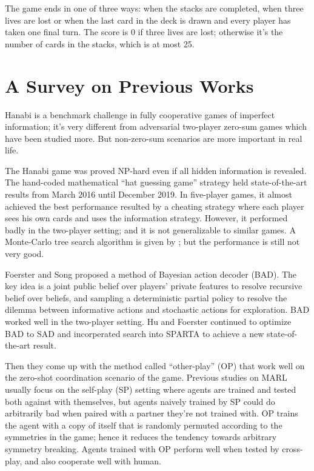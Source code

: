 \documentclass[11pt]{article}
\begin{document}
The game ends in one of three ways: when the stacks are completed, when three lives are lost or when the last card in the deck is drawn and every player has taken one final turn. The score is 0 if three lives are lost; otherwise it's the number of cards in the stacks, which is at most 25.

\section{A Survey on Previous Works}

Hanabi is a benchmark challenge in fully cooperative games of imperfect information; it's very different from adversarial two-player zero-sum games which have been studied more.\cite{bard2020the} But non-zero-sum scenarios are more important in real life.

The Hanabi game was proved \textsf{NP}-hard even if all hidden information is revealed.\cite{baffier2017hanabi} The hand-coded mathematical ``hat guessing game'' strategy\cite{cox2015how} held state-of-the-art results from March 2016 until December 2019. In five-player games, it almost achieved the best performance resulted by a cheating strategy where each player sees his own cards and uses the information strategy. However, it performed badly in the two-player setting\cite{bouzy2017playing}; and it is not generalizable to similar games. A Monte-Carlo tree search algorithm is given by \cite{walton-rivers2017evaluating}; but the performance is still not very good.

Foerster and Song proposed a method of Bayesian action decoder (BAD)\cite{foerster2018bayesian}. The key idea is a joint public belief over players' private features to resolve recursive belief over beliefs, and sampling a deterministic partial policy to resolve the dilemma between informative actions and stochastic actions for exploration. BAD worked well in the two-player setting. Hu and Foerster continued to optimize BAD to SAD\cite{hu2020simplified} and incorperated search into SPARTA\cite{lerer2020improving} to achieve a new state-of-the-art result.

Then they come up with the method called ``other-play'' (OP)\cite{hu2020other} that work well on the zero-shot coordination scenario of the game. Previous studies on MARL usually focus on the self-play (SP) setting where agents are trained and tested both against with themselves, but agents naively trained by SP could do arbitrarily bad when paired with a partner they're not trained with. OP trains the agent with a copy of itself that is randomly permuted according to the symmetries in the game; hence it reduces the tendency towards arbitrary symmetry breaking. Agents trained with OP perform well when tested by cross-play, and also cooperate well with human.
\end{document}
